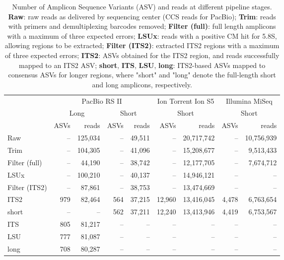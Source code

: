 \documentclass[
]{article}
\begin{document}
\begin{table}

\caption[Number of Amplicon Sequence Variants (ASV) and reads at different pipeline stages]{\label{tab:bioinfo}Number of Amplicon Sequence Variants (ASV) and reads at different pipeline stages. \textbf{Raw}: raw reads as delivered by sequencing center (CCS reads for PacBio);
\textbf{Trim}: reads with primers and demultiplexing barcodes removed;
\textbf{Filter (full)}: full length amplicons with a maximum of three expected errors;
\textbf{LSUx}: reads with a positive CM hit for 5.8S, allowing regions to be extracted;
\textbf{Filter (ITS2)}: extracted ITS2 regions with a maximum of three expected errors;
\textbf{ITS2}: ASVs obtained for the ITS2 region, and reads successfully mapped to an ITS2 ASV;
\textbf{short}, \textbf{ITS}, \textbf{LSU}, \textbf{long}: ITS2-based ASVs mapped to consensus ASVs for longer regions, where "short" and "long" denote the full-length short and long amplicons, respectively.}
\centering
\begin{tabular}[t]{lrrrrrrrr}
\toprule
\multicolumn{1}{c}{ } & \multicolumn{4}{c}{PacBio RS II} & \multicolumn{2}{c}{Ion Torrent Ion S5} & \multicolumn{2}{c}{Illumina MiSeq} \\
\cmidrule(l{3pt}r{3pt}){2-5} \cmidrule(l{3pt}r{3pt}){6-7} \cmidrule(l{3pt}r{3pt}){8-9}
\multicolumn{1}{c}{ } & \multicolumn{2}{c}{Long} & \multicolumn{2}{c}{Short} & \multicolumn{2}{c}{Short} & \multicolumn{2}{c}{Short} \\
\cmidrule(l{3pt}r{3pt}){2-3} \cmidrule(l{3pt}r{3pt}){4-5} \cmidrule(l{3pt}r{3pt}){6-7} \cmidrule(l{3pt}r{3pt}){8-9}
  & ASVs & reads & ASVs & reads & ASVs & reads & ASVs & reads\\
\midrule
Raw & – & 125,034 & – & 49,511 & – & 20,717,742 & – & 10,756,939\\
Trim & – & 104,305 & – & 41,096 & – & 15,208,677 & – & 9,513,433\\
Filter (full) & – & 44,190 & – & 38,742 & – & 12,177,705 & – & 7,674,712\\
\addlinespace
LSUx & – & 100,210 & – & 40,137 & – & 14,946,121 & – & –\\
Filter (ITS2) & – & 87,861 & – & 38,753 & – & 13,474,669 & – & –\\
ITS2 & 979 & 82,464 & 564 & 37,215 & 12,960 & 13,416,045 & 4,478 & 6,763,654\\
\addlinespace
short & – & – & 562 & 37,211 & 12,240 & 13,413,946 & 4,419 & 6,753,567\\
ITS & 805 & 81,217 & – & – & – & – & – & –\\
LSU & 777 & 81,087 & – & – & – & – & – & –\\
long & 708 & 80,287 & – & – & – & – & – & –\\
\bottomrule
\end{tabular}
\end{table}
\end{document}
